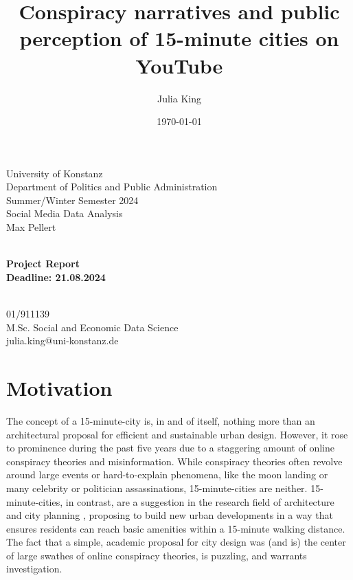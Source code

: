 \documentclass[fontsize=11pt, parskip=half]{scrartcl}
\title{Conspiracy narratives and public perception of 15-minute cities on YouTube}\let\Title\@title
\author{Julia King}          \let\Author\@author
\date{\today}           \let\Date\@date
\makeatletter
\def \papersubtitle {Project Report}
\def \paperdeadline {21.08.2024}
\def \paperevaluator {Max Pellert}
\def \paperseminar {Social Media Data Analysis}
\def \papersemester {Summer/Winter Semester 2024}
\def \paperdepartment {Department of Politics and Public Administration}
\def \paperuniversity {University of Konstanz}
\def \paperemail {julia.king@uni-konstanz.de}
\def \paperprogramme {M.Sc. Social and Economic Data Science}
\def \papermatriculationnr {01/911139}
\makeatother
\begin{document}
\setlength{\columnsep}{25pt}

\begin{titlepage}
    \newcommand{\HRule}{\rule{\linewidth}{0.5mm}}
    
    \begin{flushleft} %
        \large
        \paperuniversity\\
        \paperdepartment\\
        \papersemester\\
        \paperseminar\\
        \paperevaluator
    \end{flushleft}
    
    \vfill
    
    \begin{center} %
        \huge\bfseries \Title\\
        \vspace{0.5cm}
        \large \papersubtitle \\
        \vspace{0.5cm}
        \small Deadline: \paperdeadline
    \end{center}
    
    \vfill
    
    \begin{flushright} %
        \large
        \Author\\
        \papermatriculationnr\\
        \paperprogramme\\
        \paperemail
    \end{flushright}
\end{titlepage}

\clearpage
\setcounter{page}{1}

\section{Motivation}
\label{section:motivation}
    \parencite[12]{gloverConspiracyThinking15Minute2024}

    The concept of a 15-minute-city is, in and of itself, nothing more than an architectural proposal for efficient and sustainable urban design. However, it rose to prominence during the past five years due to a staggering amount of online conspiracy theories and misinformation. While conspiracy theories often revolve around large events or hard-to-explain phenomena, like the moon landing or many celebrity or politician assassinations, 15-minute-cities are neither. 15-minute-cities, in contrast, are a suggestion in the research field of architecture and city planning , proposing to build new urban developments in a way that ensures residents can reach basic amenities within a 15-minute walking distance. The fact that a simple, academic proposal for city design was (and is) the center of large swathes of online conspiracy theories, is puzzling, and warrants investigation. 
    
\end{document}
